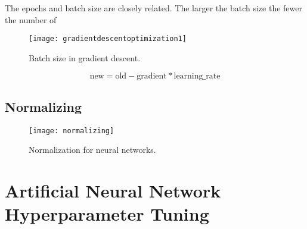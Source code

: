 The epochs and batch size are closely related.  The larger the batch size the fewer the number of

 	\begin{figure}[htb]
		\centering
		\texttt{[image: gradientdescentoptimization1]}
		\caption[Batch size in gradient descent]{Batch size in gradient descent.}
		\label{fig:gradientdescentoptimization1}
	\end{figure}

	\begin{equation}
		\textrm{new} = \textrm{old} - \textrm{gradient} * \textrm{learning\_rate}
	\end{equation}



	\subsection{Normalizing}

 	\begin{figure}[htb]
		\centering
		\texttt{[image: normalizing]}
		\caption[Normalization for neural networks]{Normalization for neural networks.}
		\label{fig:normalizing}
	\end{figure}

	\section{Artificial Neural Network Hyperparameter Tuning}

